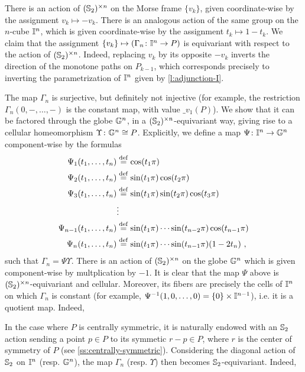 There is an action of $(\mathbb{S}_2)^{\times n}$ on the Morse frame $\{ v_k \}$, given coordinate-wise by the assignment $v_k \mapsto -v_k$. 
There is an analogous action of the same group on the $n$-cube $\mathbb{I}^n$, which is given coordinate-wise by the assignment $t_k \mapsto 1-t_k$. 
We claim that the assignment $\{v_k\} \mapsto (\Gamma_n \colon \mathbb{I}^n \to P)$ is equivariant with respect to the action of $(\mathbb{S}_2)^{\times n}$.
Indeed, replacing $v_k$ by its opposite $-v_k$ inverts the direction of the monotone paths on $P_{k-1}$, which corresponds precisely to inverting the parametrization of $\mathbb{I}^n$ given by \cref{l:adjunction-I}.

The map $\Gamma_n$ is surjective, but definitely not injective (for example, the restriction $\Gamma_n(0,-,\ldots,-)$ is the constant map, with value $\bm_{v_1}(P)$). 
We show that it can be factored through the globe $\mathbb{G}^n$, in a $(\mathbb{S}_2)^{\times n}$-equivariant way, giving rise to a cellular homeomorphism $\Upsilon \colon \mathbb{G}^n \cong P$. 
Explicitly, we define a map $\Psi \colon \mathbb{I}^n \to \mathbb{G}^n$ component-wise by the formulas
\begin{align*}
	\Psi_1(t_1,\ldots,t_n) & \stackrel{\mathrm{def}}{=} \cos(t_1 \pi) \\
	\Psi_2(t_1,\ldots,t_n) & \stackrel{\mathrm{def}}{=} \sin(t_1 \pi)\cos(t_2\pi) \\
	\Psi_3(t_1,\ldots,t_n) & \stackrel{\mathrm{def}}{=} \sin(t_1 \pi)\sin(t_2\pi)\cos(t_3\pi) \\
	 & \vdots \\
	\Psi_{n-1}(t_1,\ldots,t_n) & \stackrel{\mathrm{def}}{=} \sin(t_1 \pi) \cdots \sin(t_{n-2} \pi) \cos(t_{n-1} \pi) \\
	\Psi_n(t_1,\ldots,t_n) & \stackrel{\mathrm{def}}{=}  \sin(t_1 \pi) \cdots \sin(t_{n-1} \pi)  (1-2t_n)\ ,
\end{align*}
such that $\Gamma_n = \Psi \Upsilon$. 
There is an action of $(\mathbb{S}_2)^{\times n}$ on the globe $\mathbb{G}^n$ which is given component-wise by multplication by $-1$. 
It is clear that the map $\Psi$ above is $(\mathbb{S}_2)^{\times n}$-equivariant and cellular. 
Moreover, its fibers are precisely the cells of $\mathbb{I}^n$ on which $\Gamma_n$ is constant (for example, $\Psi^{-1}(1,0,\ldots,0)=\{0\} \times \mathbb{I}^{n-1}$), i.e. it is a quotient map. 
Indeed, 

In the case where $P$ is centrally symmetric, it is naturally endowed with an $\mathbb{S}_2$ action sending a point $p \in P$ to its symmetic $r-p \in P$, where $r$ is the center of symmetry of $P$ (see \cref{ss:centrally-symmetric}). 
Considering the diagonal action of $\mathbb{S}_2$ on $\mathbb{I}^n$ (resp. $\mathbb{G}^n$), the map $\Gamma_n$ (resp. $\Upsilon$) then becomes $\mathbb{S}_2$-equivariant.
Indeed,   
